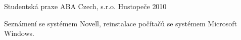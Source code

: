 \begin{cventries}
   \cventry
   {Studentská praxe}
   {ABA Czech, s.r.o.}
   {Hustopeče}
   {2010}
   {
    \begin{cvitems}
      \item {Seznámení se systémem Novell, reinstalace počítačů se systémem Microsoft Windows.}
    \end{cvitems}
   }

\end{cventries}